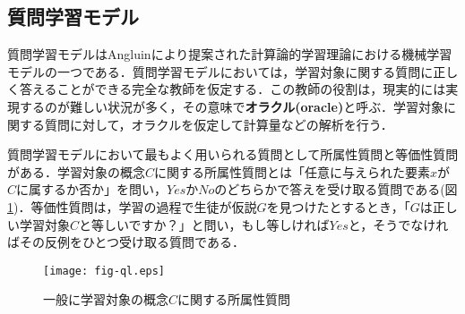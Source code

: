 \subsection{質問学習モデル}
質問学習モデルはAngluin\cite{angluin-ml1988}により提案された計算論的学習理論における機械学習モデルの一つである．質問学習モデルにおいては，学習対象に関する質問に正しく答えることができる完全な教師を仮定する．この教師の役割は，現実的には実現するのが難しい状況が多く，その意味で\textbf{オラクル(oracle)}と呼ぶ．学習対象に関する質問に対して，オラクルを仮定して計算量などの解析を行う．

質問学習モデルにおいて最もよく用いられる質問として所属性質問と等価性質問がある．学習対象の概念$C$に関する所属性質問とは「任意に与えられた要素$x$が$C$に属するか否か」を問い，$Yes$か$No$のどちらかで答えを受け取る質問である(図\ref{fig:ql})．等価性質問は，学習の過程で生徒が仮説$G$を見つけたとするとき，「$G$は正しい学習対象$C$と等しいですか？」と問い，もし等しければ$Yes$と，そうでなければその反例をひとつ受け取る質問である．

\begin{figure}[tb]
  \centering
  \texttt{[image: fig-ql.eps]}
  \caption{一般に学習対象の概念$C$に関する所属性質問}\label{fig:ql}
\end{figure}